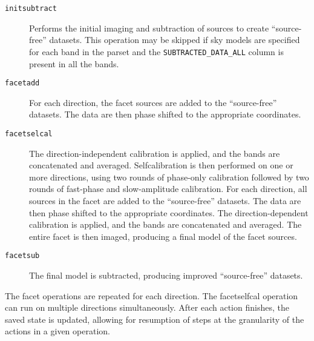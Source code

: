 \documentclass[structabstract]{article}
\begin{document}
\begin{description}
\item[{\tt initsubtract}] Performs the initial imaging and subtraction of sources to
create ``source-free'' datasets. This operation may be skipped if sky models are
specified for each band in the parset and the {\tt SUBTRACTED\_DATA\_ALL} column
is present in all the bands.
\item[{\tt facetadd}] For each direction, the facet sources are added to the
``source-free'' datasets. The data are then phase shifted to the appropriate
coordinates.
\item[{\tt facetselcal}] The direction-independent calibration is applied, and
the bands are concatenated and averaged. Selfcalibration is then performed on
one or more directions, using two rounds of phase-only calibration followed by
two rounds of fast-phase and slow-amplitude calibration. For each direction, all
sources in the facet are added to the ``source-free'' datasets. The data are
then phase shifted to the appropriate coordinates. The direction-dependent
calibration is applied, and the bands are concatenated and averaged. The entire
facet is then imaged, producing a final model of the facet sources.
\item[{\tt facetsub}] The final model is subtracted, producing improved
``source-free'' datasets.
\end{description}

The facet operations are repeated for each direction. The facetselfcal operation
can run on multiple directions simultaneously. After each action finishes, the
saved state is updated, allowing for resumption of steps at the granularity of
the actions in a given operation.
\end{document}
